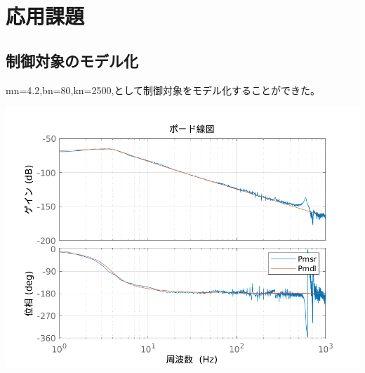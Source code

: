 \documentclass[dvipdfmx, twocolumn]{jsarticle}
\begin{document}
\section{応用課題}

\subsection{制御対象のモデル化}

mn=4.2,bn=80,kn=2500,として制御対象をモデル化することができた。

\includegraphics[scale=0.5]{4.png}
\end{document}
